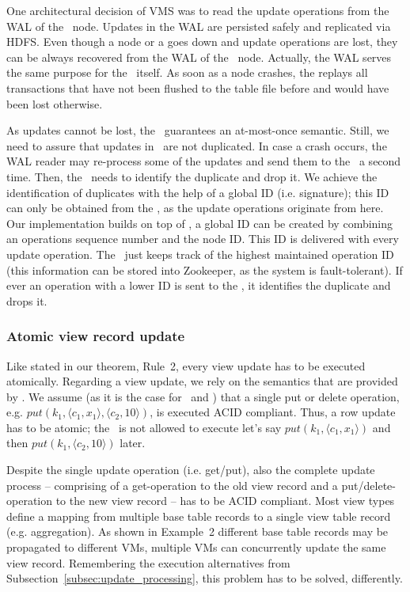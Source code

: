 One architectural decision of VMS was to read the update operations from
the WAL of the \KVS\ node. Updates in the WAL are persisted safely and
replicated via HDFS. Even though a node or a \VM goes down and update 
operations are lost, they can be always recovered from the WAL of the 
\KVS\ node. Actually, the WAL serves the same purpose for the \KVS\ itself.
As soon as a node crashes, the \KVS replays all transactions that have 
not been flushed to the table file before and would have been lost otherwise.


As updates cannot be lost, the \VMS\ guarantees an at-most-once semantic.
Still, we need to assure that updates in \VMS\ are not duplicated. In case a crash 
occurs, the WAL reader may re-process some of 
the updates and send them to the \VMs\ a second time. Then, the \VM\ needs 
to identify the duplicate and drop it. We achieve the identification of
duplicates with the help of a global ID (i.e. signature); this ID can only 
be obtained from the \KVS, as the update operations originate from here. 
Our implementation builds on top of \HB, a global ID can be created by 
combining an operations sequence number and the node ID. This ID is delivered
with every update operation. The \VM\ just keeps track of the highest maintained
operation ID (this information can be stored into Zookeeper, as the system is 
fault-tolerant). If ever an operation with a lower ID is sent to the \VM, it 
identifies the duplicate and drops it.




\subsubsection{Atomic view record update}
\label{subsubsec:atomic_update} 

Like stated in our theorem, Rule~2, every view update has to be executed 
atomically. Regarding a view update, we rely on the semantics that are 
provided by \KVS. We assume (as it is the case for \HB\ and \CAS) that a 
single put or delete operation, e.g. $put(k_1, \langle c_1, x_1\rangle, 
\langle c_2, 10\rangle)$, is executed ACID compliant. Thus, a row update 
has to be atomic; the \KVS\ is not allowed to execute let's say 
$put(k_1, \langle c_1, x_1\rangle)$ and then $put(k_1, \langle c_2, 
10\rangle)$ later. 


Despite the single update operation (i.e. get/put), also the complete 
update process -- comprising of a get-operation to the old view record 
and a put/delete- operation to the new view record -- has to be ACID 
compliant. Most view types define a mapping from multiple base table 
records to a single view table record (e.g. aggregation). As shown in 
Example~2 different base table records may be propagated to different 
VMs, multiple VMs can concurrently update the same view record. 
Remembering the execution alternatives from 
Subsection~\ref{subsec:update_processing}, this problem has to be 
solved, differently. 




